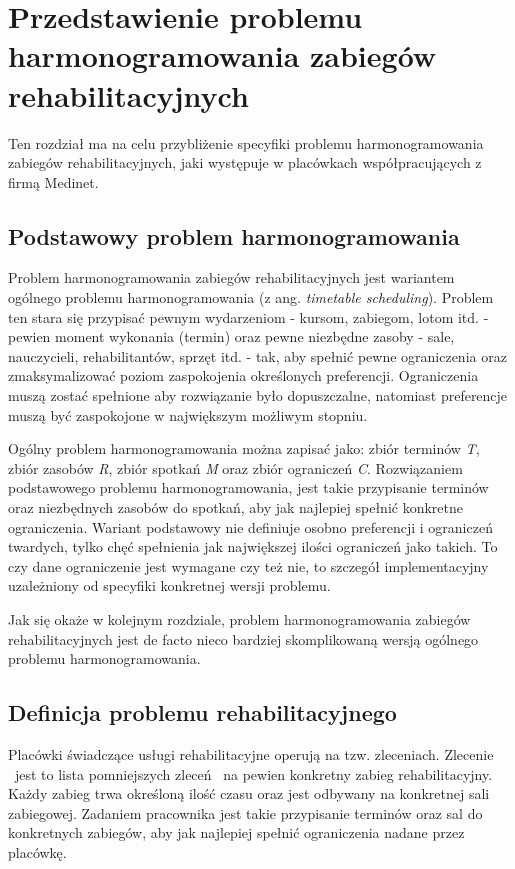 \chapter{Przedstawienie problemu harmonogramowania zabiegów rehabilitacyjnych}
Ten rozdział ma na celu przybliżenie specyfiki problemu harmonogramowania zabiegów
rehabilitacyjnych, jaki występuje w placówkach współpracujących z firmą Medinet.

\section{Podstawowy problem harmonogramowania}
Problem harmonogramowania zabiegów rehabilitacyjnych jest wariantem ogólnego problemu
harmonogramowania (z ang. \emph{timetable scheduling}). Problem ten  stara się
przypisać pewnym wydarzeniom - kursom, zabiegom, lotom itd. - pewien moment
wykonania (termin) oraz pewne niezbędne zasoby - sale, nauczycieli,
rehabilitantów, sprzęt itd. - tak, aby spełnić pewne ograniczenia oraz
zmaksymalizować poziom zaspokojenia określonych preferencji. Ograniczenia muszą
zostać spełnione aby rozwiązanie było dopuszczalne, natomiast preferencje muszą
być zaspokojone w największym możliwym stopniu.

Ogólny problem harmonogramowania można zapisać \cite{habib2013} jako:
zbiór terminów \emph{T}, zbiór zasobów \emph{R}, zbiór spotkań \emph{M} oraz
zbiór ograniczeń \emph{C}. Rozwiązaniem podstawowego problemu harmonogramowania,
jest takie przypisanie terminów oraz niezbędnych zasobów do spotkań, aby jak
najlepiej spełnić konkretne ograniczenia. Wariant podstawowy nie definiuje
osobno preferencji i ograniczeń twardych, tylko chęć spełnienia jak największej ilości ograniczeń
jako takich. To czy dane ograniczenie jest wymagane czy też nie, to szczegół
implementacyjny uzależniony od specyfiki konkretnej wersji problemu.

Jak się okaże w kolejnym rozdziale, problem harmonogramowania zabiegów
rehabilitacyjnych jest de facto nieco bardziej skomplikowaną wersją ogólnego
problemu harmonogramowania.
\pagebreak
\section{Definicja problemu rehabilitacyjnego}
Placówki świadczące usługi rehabilitacyjne operują na tzw. zleceniach. Zlecenie
\sRef\ jest to lista pomniejszych zleceń \sSubRef\ na pewien konkretny zabieg rehabilitacyjny.
Każdy zabieg trwa określoną ilość czasu oraz jest odbywany na konkretnej sali
zabiegowej. Zadaniem pracownika jest takie przypisanie terminów oraz sal do konkretnych
zabiegów, aby jak najlepiej spełnić ograniczenia nadane przez placówkę.

